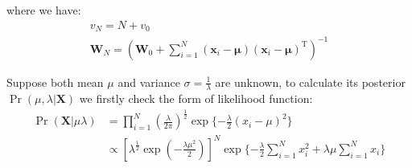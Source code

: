 where we have:
\begin{gather}
v_{N}=N+v_{0}\\
\mathbf{W}_{N}=(\mathbf{W}_{0}+\sum_{i=1}^{N}(\mathbf{x}_{i}-\boldsymbol{\mu})(\mathbf{x}_{i}-\boldsymbol{\mu})^{\mathrm{T}})^{-1}
\end{gather}


Suppose both mean $\mu$ and variance $\sigma=\frac{1}{\lambda}$ are unknown, to calculate its posterior $\Pr(\mu,\lambda\vert\mathbf{X})$ we firstly check the form of likelihood function:
\begin{equation}
\begin{split}
\Pr(\mathbf{X}\vert\mu\lambda)&=\prod_{i=1}^{N}(\frac{\lambda}{2\pi})^{\frac{1}{2}}\exp{}\{-\frac{\lambda}{2}(x_{i}-\mu)^2\}\\
&\varpropto[\lambda^{\frac{1}{2}}\exp{}(-\frac{\lambda\mu^2}{2})]^{N}\exp{}\{-\frac{\lambda}{2}\sum_{i=1}^{N}x_{i}^{2}+\lambda\mu\sum_{i=1}^{N}x_{i}\}
\end{split}
\end{equation}


